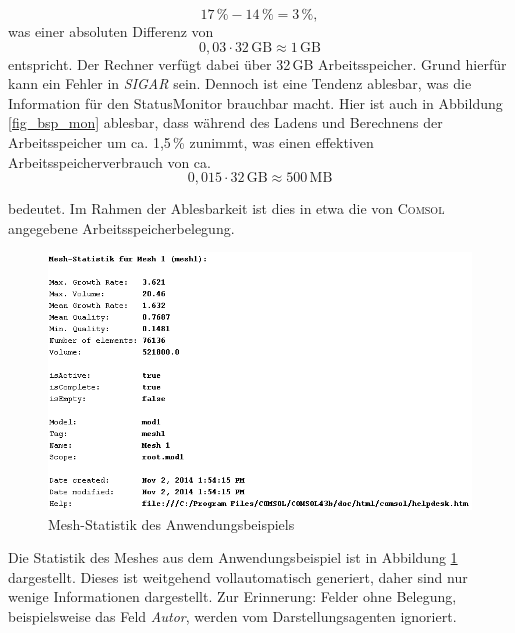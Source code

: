 \documentclass[a4paper,12pt,oneside,openright,onecolumn,final,titlepage,fleqn,ngerman]{scrreprt}
\newcommand{\parag}{\\[2ex]}
\newcommand{\repag}{Darstellungsagent}
\begin{document}
	\[
		17\,\% - 14\,\% = 3\,\%,
	\]
	was einer absoluten Differenz von
	\[
		0{,}03 \cdot 32\,\text{GB} \approx 1\,\text{GB}
	\]
	entspricht. Der Rechner verfügt dabei über 32\,GB Arbeitsspeicher. Grund hierfür kann ein Fehler in \emph{SIGAR} sein. Dennoch ist eine Tendenz ablesbar, was die Information für den StatusMonitor brauchbar macht. Hier ist auch in Abbildung \ref{fig_bsp_mon} ablesbar, dass während des Ladens und Berechnens der Arbeitsspeicher um ca. 1,5\,\% zunimmt, was einen effektiven Arbeitsspeicherverbrauch von ca.
	\[
		0{,}015 \cdot 32\,\text{GB} \approx 500\,\text{MB}
	\]
	
	bedeutet. Im Rahmen der Ablesbarkeit ist dies in etwa die von \textsc{Comsol} angegebene Arbeitsspeicherbelegung.\parag{}
	\begin{figure}[ht]
		\includegraphics[keepaspectratio=true,width=\textwidth]{res/bsp_mesh.png}
		\caption{Mesh-Statistik des Anwendungsbeispiels}
		\label{fig_bsp_mesh}
	\end{figure}
	Die Statistik des Meshes aus dem Anwendungsbeispiel ist in Abbildung \ref{fig_bsp_mesh} dargestellt. Dieses ist weitgehend vollautomatisch generiert, daher sind nur wenige Informationen dargestellt. Zur Erinnerung: Felder ohne Belegung, beispielsweise das Feld \emph{Autor}, werden vom \repag{}en ignoriert.
	
\end{document}
